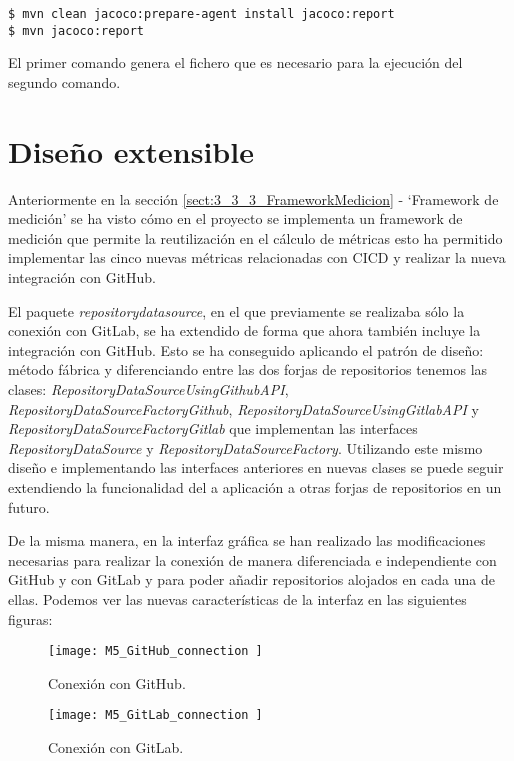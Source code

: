 \begin{minipage}{\linewidth}
{\tiny
\begin{verbatim}
$ mvn clean jacoco:prepare-agent install jacoco:report
$ mvn jacoco:report
\end{verbatim}
}
\end{minipage}

El primer comando genera el fichero  que es necesario para la ejecución del segundo comando.


\section{Diseño extensible}
Anteriormente en la sección \ref{sect:3_3_3_FrameworkMedicion} - `Framework de medición' se ha visto cómo en el proyecto se implementa un framework de medición que permite la reutilización en el cálculo de métricas esto ha permitido implementar las cinco nuevas métricas relacionadas con CICD y realizar la nueva integración con GitHub.

El paquete \textit{repositorydatasource}, en el que previamente se realizaba sólo la conexión con GitLab, se ha extendido de forma que ahora también incluye la integración con GitHub. Esto se ha conseguido aplicando el patrón de diseño: método fábrica y diferenciando entre las dos forjas de repositorios tenemos las clases: \textit{RepositoryDataSourceUsingGithubAPI}, \textit{RepositoryDataSourceFactoryGithub}, \textit{RepositoryDataSourceUsingGitlabAPI} y \textit{RepositoryDataSourceFactoryGitlab} que implementan las interfaces \textit{RepositoryDataSource} y \textit{RepositoryDataSourceFactory}. Utilizando este mismo diseño e implementando las interfaces anteriores en nuevas clases se puede seguir extendiendo la funcionalidad del a aplicación a otras forjas de repositorios en un futuro.

De la misma manera, en la interfaz gráfica se han realizado las modificaciones necesarias para realizar la conexión de manera diferenciada e independiente con GitHub y con GitLab y para poder añadir repositorios alojados en cada una de ellas. Podemos ver las nuevas características de la interfaz en las siguientes figuras:

\begin{figure}[!h]
	\centering
	\texttt{[image: M5\_GitHub\_connection ]}
	\caption{Conexión con GitHub.}\label{fig:M5_GitHub_connection}
\end{figure}
\FloatBarrier

\begin{figure}[!h]
	\centering
	\texttt{[image: M5\_GitLab\_connection ]}
	\caption{Conexión con GitLab.}\label{fig:M5_GitLab_connection}
\end{figure}
\FloatBarrier

